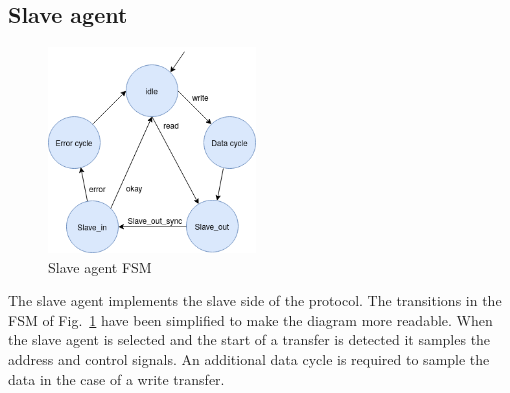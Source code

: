 \subsection{Slave agent}
\begin{figure}
\includegraphics[width=5.5cm]{figs/hw/sAgent_FSM.png}
\caption{Slave agent FSM}\label{fig:rsfsm}
\end{figure}  

 
The slave agent implements the slave side of the protocol. The transitions in the FSM of Fig.~\ref{fig:rsfsm} have been simplified to make the diagram more readable. When the slave agent is selected and the start of a transfer is detected it samples the address and control signals. An additional data cycle is
required to sample the data in the case of a write transfer.

